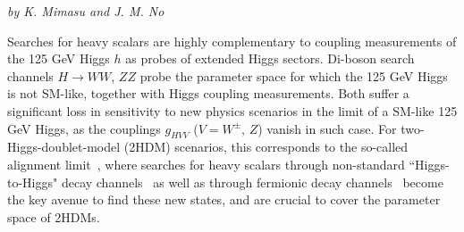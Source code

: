 
\begin{center}
 {\it{by K. Mimasu and J. M. No 
}}
\end{center}








Searches for heavy scalars are highly complementary to coupling measurements of the 125 GeV Higgs $h$ as probes of extended Higgs sectors. Di-boson search channels $H \to WW$, $ZZ$ probe the parameter space for which the 125 GeV Higgs is not SM-like, together with Higgs coupling measurements. Both suffer a significant loss in sensitivity to new physics scenarios in the limit of a SM-like 125 GeV Higgs, as the couplings $g_{HVV}$ ($V = W^{\pm},\,Z$) vanish in such case. For two-Higgs-doublet-model (2HDM) scenarios, this corresponds to the so-called alignment limit~\cite{Gunion:2002zf},
where searches for heavy scalars through non-standard ``Higgs-to-Higgs"
decay channels~\cite{Coleppa:2014hxa,Dorsch:2014qja,Li:2015lra,Kling:2016opi,Dorsch:2016tab} 
as well as through fermionic decay channels~\cite{Craig:2015jba,Gori:2016zto} become the key avenue to find these new states, and are crucial to cover the parameter space of 2HDMs.

